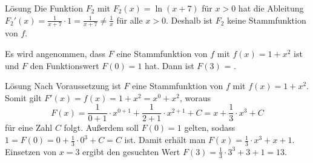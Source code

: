 \begin{MExercises}
\begin{MExercise}
\begin{MHint}{Lösung}
Die Funktion $F_2$ mit $F_2(x) = \ln(x + 7)$ für $x > 0$ hat die Ableitung
$F_2'(x) = \frac{1}{x + 7} \cdot 1 = \frac{1}{x + 7} \neq \frac{1}{x}$ für 
alle $x > 0$. Deshalb ist $F_2$ keine Stammfunktion von $f$.
%
\end{MHint}
\end{MExercise}

\begin{MExercise}
Es wird angenommen, dass $F$ eine Stammfunktion von $f$ mit $f(x)=1 + x^2$ ist
und $F$ den Funktionswert $F(0) = 1$ hat. Dann 
ist $F(3)$ = .
\begin{MHint}{Lösung}
Nach Voraussetzung ist $F$ eine Stammfunktion von $f$ mit $f(x) = 1 + x^2$. 
Somit gilt $F'(x) = f(x) = 1 + x^2 = x^0 + x^2$, woraus 
\[
F(x) = \frac{1}{0 + 1} \cdot x^{0+1} + \frac{1}{2 + 1} \cdot x^{2 + 1} + C %
= x + \frac{1}{3} \cdot x^3 + C %
\]
für eine Zahl $C$ folgt.
Außerdem soll $F(0) = 1$ gelten, sodass 
$1 = F(0) = 0 + \frac{1}{3} \cdot 0^3 + C = C$ ist. Damit erhält man
$F(x) = \frac{1}{3} \cdot x^3 + x + 1$. Einsetzen von $x = 3$ ergibt den 
gesuchten Wert $F(3) = \frac{1}{3} \cdot 3^3 + 3 + 1 = 13$.
\end{MHint}
\end{MExercise}

\end{MExercises}






